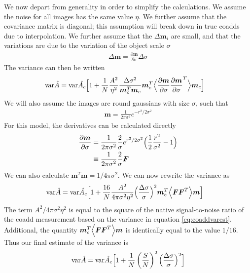 \documentclass[a4paper,fleqn,usenatbib,referee]{mnras}
\begin{document}
We now depart from generality in order to simplify the calculations.  We assume
the noise for all images has the same value $\eta$. We further assume that the covariance
matrix is diagonal; this assumption will break down in true coadds due to
interpolation.  We further assume that the $\Delta \boldsymbol{m}_i$ are small,
and that the variations are due to the variation of the object
scale $\sigma$
\begin{align}
    \Delta \boldsymbol{m} = \frac{\partial \boldsymbol{m}}{\partial \sigma} \Delta \sigma
\end{align}
The variance can then be written
\begin{align}
    {\rm var}\hat{A} &= {\rm var}\hat{A_c} \Bigl[ 1 + 
        \frac{1}{N}\frac{A^2}{\eta^2} \frac{\Delta \sigma^2}{\boldsymbol{m}_c^T \boldsymbol{m}_c} \boldsymbol{m}_c^T  \Bigl< \frac{\partial \boldsymbol{m}}{\partial \sigma} \frac{\partial \boldsymbol{m}}{\partial \sigma}^T \Bigr>   \boldsymbol{m}_c  \Bigr]
\end{align}
We will also assume the images are round gaussians with size $\sigma$, such that
\begin{align}
    \boldsymbol{m} = \frac{1}{2 \pi \sigma^2} e^{-r^2/2 \sigma^2 }
\end{align}
For this model, the derivatives can be calculated directly
\begin{align}
    \frac{\partial \boldsymbol{m}}{\partial \sigma} &= \frac{1}{2 \pi \sigma^2} \frac{2}{\sigma} e^{r^2/2 \sigma^2} \Bigl( \frac{1}{2}\frac{r^2}{\sigma^2} - 1 \Bigr) \\
    &\equiv \frac{1}{2 \pi \sigma^2} \frac{2}{\sigma} \boldsymbol{F}
\end{align}
We can also calculate $\boldsymbol{m}^T \boldsymbol{m} = 1/4 \pi \sigma^2$. We
can now rewrite the variance as
\begin{align}
    {\rm var}\hat{A} &= {\rm var}\hat{A_c} \Bigl[ 1 + 
        \frac{16}{N}\frac{A^2}{4 \pi \sigma^2 \eta^2} \Bigl( \frac{\Delta \sigma}{\sigma} \Bigr)^2 \boldsymbol{m}_c^T  \Bigl< \boldsymbol{F} \boldsymbol{F}^T \Bigr> \boldsymbol{m} \Bigr]
\end{align}
The term $A^2/4 \pi \sigma^2 \eta^2$ is equal to the square of 
the native signal-to-noise
ratio of the coadd measurement based on the variance in equation \ref{eq:coaddvarest}.
Additional, the quantity $\boldsymbol{m}_c^T  \Bigl< \boldsymbol{F} \boldsymbol{F}^T \Bigr> \boldsymbol{m}$
is identically equal to the value $1/16$.  Thus our final estimate of the variance is
\begin{align} \label{eq:varbasic}
    {\rm var}\hat{A} = {\rm var}\hat{A_c} \Bigl[ 1 + 
        \frac{1}{N} \left( \frac{S}{N} \right)^2 \Bigl( \frac{\Delta \sigma}{\sigma} \Bigr)^2 \Bigr]
\end{align}
\end{document}
